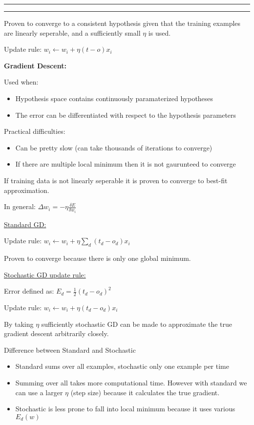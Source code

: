 \documentclass[11pt]{article}
\newcounter{questionCounter}
\newcounter{partCounter}[questionCounter]
\newenvironment{question}[2][\arabic{questionCounter}]{%
    \addtocounter{questionCounter}{1}%
    \setcounter{partCounter}{0}%
    \vspace{.25in} \hrule \vspace{0.5em}%
        \noindent{\bf #1: #2}%
    \vspace{0.8em} \hrule \vspace{.10in}%
}{}
\begin{document}
\begin{question}{Nueral Nets: }
Proven to converge to a consistent hypothesis given that the training examples are 
linearly seperable, and a sufficiently small $\eta$ is used.

Update rule: $w_i \leftarrow w_i + \eta (t-o)x_i$

\textbf{Gradient Descent:}

Used when:
\begin{itemize}
    \item Hypothesis space contains continuously paramaterized hypotheses
    \item The error can be differentiated with respect to the hypothesis parameters
\end{itemize}

Practical difficulties:
\begin{itemize}
    \item Can be pretty slow (can take thousands of iterations to converge)
    \item If there are multiple local minimum then it is not gaurunteed to converge
\end{itemize}

If training data is not linearly seperable it is proven to converge to best-fit
approximation.

In general: $\Delta w_i = - \eta \frac{\delta E}{\delta w_i}$


\underline{Standard GD:} 

Update rule: $w_i  \leftarrow w_i + \eta \sum_d (t_d - o_d)x_i$

Proven to converge because there is only one global minimum.

\underline{Stochastic GD update rule:}

Error defined as: $E_d = \frac{1}{2}(t_d - o_d)^2$

Update rule: $w_i \leftarrow w_i + \eta(t_d - o_d)x_i$

By taking $\eta$ sufficiently stochastic GD can be made to approximate the true
gradient descent arbitrarily closely.

Difference between Standard and Stochastic
\begin{itemize}
    \item Standard sums over all examples, stochastic only one example per time 
    \item Summing over all takes more computational time. However with standard we
    can use a larger $\eta$ (step size) because it calculates the true gradient.
    \item Stochastic is less prone to fall into local minimum because it uses various
    $E_d(w)$
\end{itemize}


\end{question}
\end{document}
